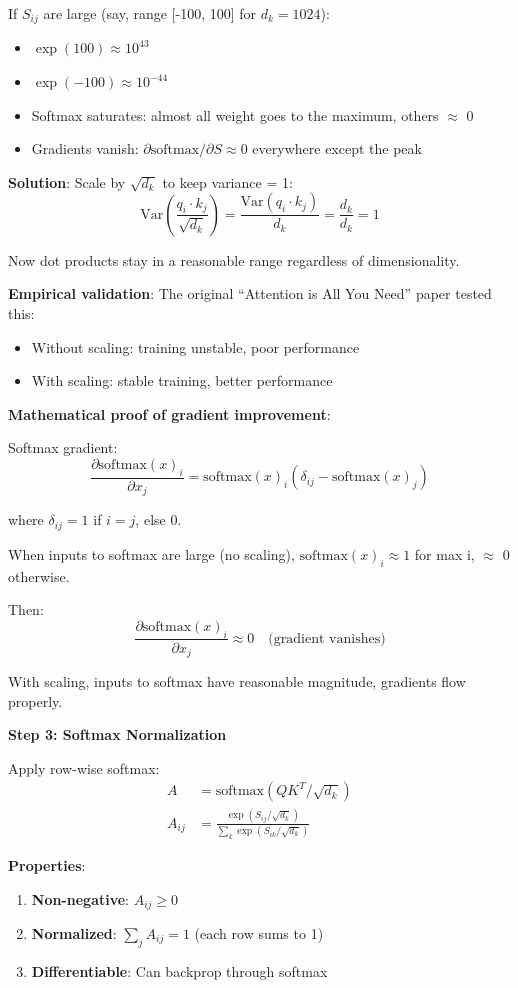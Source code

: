 \documentclass[11pt,oneside]{book}
\begin{document}
If $S_{ij}$ are large (say, range [-100, 100] for $d_k=1024$):
\begin{itemize}
\item $\exp(100) \approx 10^{43}$
\item $\exp(-100) \approx 10^{-44}$
\item Softmax saturates: almost all weight goes to the maximum, others $\approx$ 0
\item Gradients vanish: $\partial \text{softmax}/\partial S \approx 0$ everywhere except the peak
\end{itemize}

\textbf{Solution}: Scale by $\sqrt{d_k}$ to keep variance = 1:
\[
\text{Var}\left(\frac{q_i \cdot k_j}{\sqrt{d_k}}\right) = \frac{\text{Var}(q_i \cdot k_j)}{d_k} = \frac{d_k}{d_k} = 1
\]

Now dot products stay in a reasonable range regardless of dimensionality.

\textbf{Empirical validation}: The original ``Attention is All You Need'' paper tested this:
\begin{itemize}
\item Without scaling: training unstable, poor performance
\item With scaling: stable training, better performance
\end{itemize}

\textbf{Mathematical proof of gradient improvement}:

Softmax gradient:
\[
\frac{\partial \text{softmax}(x)_i}{\partial x_j} = \text{softmax}(x)_i (\delta_{ij} - \text{softmax}(x)_j)
\]

where $\delta_{ij} = 1$ if $i=j$, else 0.

When inputs to softmax are large (no scaling), $\text{softmax}(x)_i \approx 1$ for max i, $\approx$ 0 otherwise.

Then:
\[
\frac{\partial \text{softmax}(x)_i}{\partial x_j} \approx 0  \quad \text{(gradient vanishes)}
\]

With scaling, inputs to softmax have reasonable magnitude, gradients flow properly.

\textbf{Step 3: Softmax Normalization}

Apply row-wise softmax:
\begin{align*}
A &= \text{softmax}(QK^T / \sqrt{d_k}) \\
A_{ij} &= \frac{\exp(S_{ij}/\sqrt{d_k})}{\sum_k \exp(S_{ik}/\sqrt{d_k})}
\end{align*}

\textbf{Properties}:
\begin{enumerate}
\item \textbf{Non-negative}: $A_{ij} \geq 0$
\item \textbf{Normalized}: $\sum_j A_{ij} = 1$ (each row sums to 1)
\item \textbf{Differentiable}: Can backprop through softmax
\end{enumerate}
\end{document}

